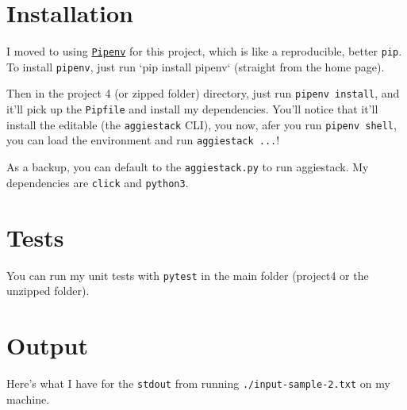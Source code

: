 \documentclass[11pt]{article}
\begin{document}
\section{Installation}
\label{sec:org230be07}
I moved to using \href{https://docs.pipenv.org/}{\texttt{Pipenv}} for this project, which is like a reproducible, better \texttt{pip}.  To install \texttt{pipenv}, just run `pip install pipenv` (straight from the home page).

Then in the project 4 (or zipped folder) directory, just run \texttt{pipenv install}, and it'll pick up the \texttt{Pipfile} and install my dependencies.  You'll notice that it'll install the editable (the \texttt{aggiestack} CLI), you now, afer you run \texttt{pipenv shell}, you can load the environment and run \texttt{aggiestack ...}!  

As a backup, you can default to the \texttt{aggiestack.py} to run aggiestack.  My dependencies are \texttt{click} and \texttt{python3}.

\section{Tests}
\label{sec:orgb3f7bab}
You can run my unit tests with \texttt{pytest} in the main folder (project4 or the unzipped folder).

\section{Output}
\label{sec:orgc3c92d1}
Here's what I have for the \texttt{stdout} from running \texttt{./input-sample-2.txt} on my machine.
\end{document}
